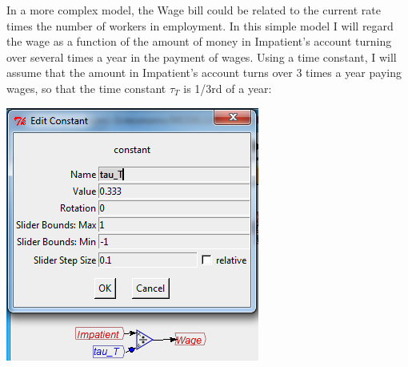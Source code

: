 In a more complex model, the Wage bill could be related to the current
rate times the number of workers in employment. In this simple model
I will regard the wage as a function of the amount of money in Impatient's
account turning over several times a year in the payment of wages.
Using a time constant, I will assume that the amount in Impatient's
account turns over 3 times a year paying wages, so that the time constant
$\tau_{T}$ is 1/3rd of a year:
\begin{center}
\includegraphics{images/NewItem176} 
\par\end{center}

